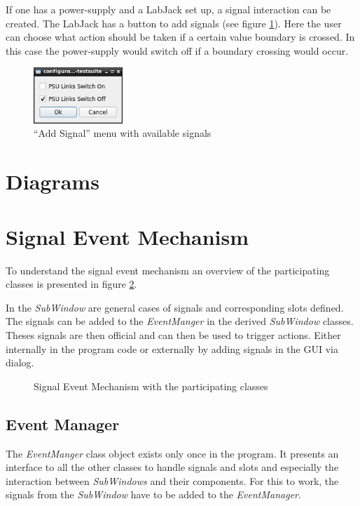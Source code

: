 \documentclass[10pt,a4paper]{article}
\begin{document}
	If one has a power-supply and a LabJack set up, a signal interaction can be created. The LabJack has a button to add signals (see figure \ref{f:sem_menu}). Here the user can choose what action should be taken if a certain value boundary is crossed. In this case the power-supply would switch off if a boundary crossing would occur.
	
	\begin{figure}[H]
	\centering
	\includegraphics[width=0.3\textwidth]{./5_sem_menu.png}
	\caption{\enquote{Add Signal} menu with available signals}
	\label{f:sem_menu}
	\end{figure}


\appendix

\section{Diagrams}

\section{Signal Event Mechanism}

To understand the signal event mechanism an overview of the participating classes is presented in figure \ref{f:signal_event_mechanism}. 

\bigbreak

In the \textit{SubWindow} are general cases of signals and corresponding slots defined. The signals can be added to the \textit{EventManger} in the derived \textit{SubWindow} classes. Theses signals are then official and can then be used to trigger actions. Either internally in the program code or externally by adding signals in the GUI via dialog. 

\begin{figure}[H]
\centering
\caption{Signal Event Mechanism with the participating classes}
\label{f:signal_event_mechanism}
\end{figure}

	\subsection{Event Manager}
	
	The \textit{EventManger} class object exists only once in the program. It presents an interface to all the other classes to handle signals and slots and especially the interaction between \textit{SubWindows} and their components. For this to work, the signals from the \textit{SubWindow} have to be added to the \textit{EventManager}.
	
\end{document}
